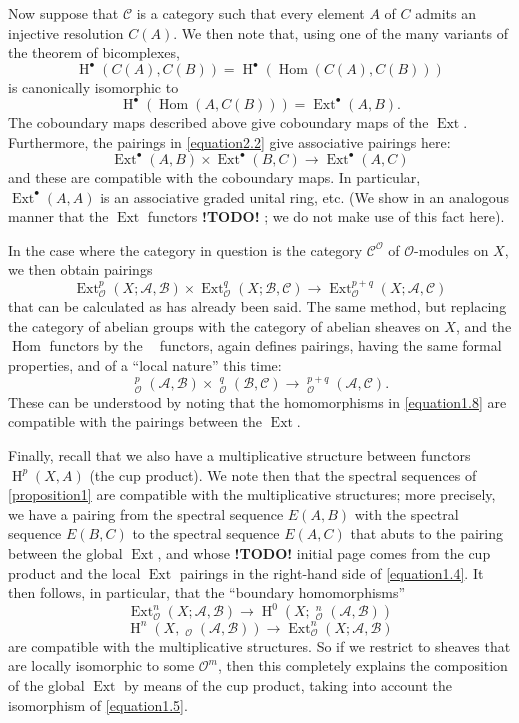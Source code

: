 \documentclass{article}
\theoremstyle{plain}
\newcommand{\sh}{\mathscr}
\newcommand{\cat}{\mathcal}
\DeclareMathOperator{\Ext}{Ext}
\DeclareMathOperator{\Hom}{Hom}
\DeclareMathOperator{\shExt}{\underline{Ext}}
\DeclareMathOperator{\shHom}{\underline{Hom}}
\DeclareMathOperator{\HH}{H}
\newcommand{\todo}{\textbf{ !TODO! }}
\newcommand{\oldpage}[1]{\marginpar{\footnotesize$\Big\vert$ \textit{p.~#1}}}
\begin{document}
Now suppose that $\cat{C}$ is a category such that every element $A$ of $C$ admits an injective resolution $C(A)$.
We then note that, using one of the many variants of the theorem of bicomplexes,
\[
  \HH^\bullet(C(A),C(B)) = \HH^\bullet(\Hom(C(A),C(B)))
\]
is canonically isomorphic to
\[
  \HH^\bullet(\Hom(A,C(B))) = \Ext^\bullet(A,B).
\]
The coboundary maps described above give coboundary maps of the $\Ext$.
Furthermore, the pairings in \cref{equation2.2} give associative pairings here:
\[
\label{equation2.3}
  \Ext^\bullet(A,B)\times\Ext^\bullet(B,C) \to \Ext^\bullet(A,C)
\tag{2.3}
\]
and these are compatible with the coboundary maps.
In particular, $\Ext^\bullet(A,A)$ is an associative graded unital ring, etc.
(We show in an analogous manner that the $\Ext$ functors \todo;
we do not make use of this fact here).

In the case where the category in question is the category $\cat{C}^\sh{O}$ of $\sh{O}$-modules on $X$, we then obtain pairings
\[
\label{equation2.4}
  \Ext_\sh{O}^p(X;\sh{A},\sh{B})\times\Ext_\sh{O}^q(X;\sh{B},\sh{C}) \to \Ext_\sh{O}^{p+q}(X;\sh{A},\sh{C})
\tag{2.4}
\]
that can be calculated as has already been said.
The same method, but replacing the category of abelian groups with the category of abelian sheaves on $X$, and the $\Hom$ functors by the $\shHom$ functors, again defines pairings, having the same formal properties, and of a ``local nature'' this time:
\[
\label{equation2.5}
  \shExt_\sh{O}^p(\sh{A},\sh{B})\times\shExt_\sh{O}^q(\sh{B},\sh{C}) \to \shExt_\sh{O}^{p+q}(\sh{A},\sh{C}).
\tag{2.5}
\]
These can be understood by noting that the homomorphisms in \cref{equation1.8} are compatible with the pairings between the $\Ext$.

\oldpage{149-05}
Finally, recall that we also have a multiplicative structure between functors $\HH^p(X,A)$ (the cup product).
We note then that the spectral sequences of \cref{proposition1} are compatible with the multiplicative structures;
more precisely, we have a pairing from the spectral sequence $E(A,B)$ with the spectral sequence $E(B,C)$ to the spectral sequence $E(A,C)$ that abuts to the pairing between the global $\Ext$, and whose \todo initial page comes from the cup product and the local $\Ext$ pairings in the right-hand side of \cref{equation1.4}.
It then follows, in particular, that the ``boundary homomorphisms''
\[
\label{equation2.6}
  \Ext_\sh{O}^n(X;\sh{A},\sh{B}) \to \HH^0(X;\shExt_\sh{O}^n(\sh{A},\sh{B}))
\tag{2.6}
\]
\[
\label{equation2.7}
  \HH^n(X,\shHom_\sh{O}(\sh{A},\sh{B})) \to \Ext_\sh{O}^n(X;\sh{A},\sh{B})
\tag{2.7}
\]
are compatible with the multiplicative structures.
So if we restrict to sheaves that are locally isomorphic to some $\sh{O}^m$, then this completely explains the composition of the global $\Ext$ by means of the cup product, taking into account the isomorphism of \cref{equation1.5}.
\end{document}

